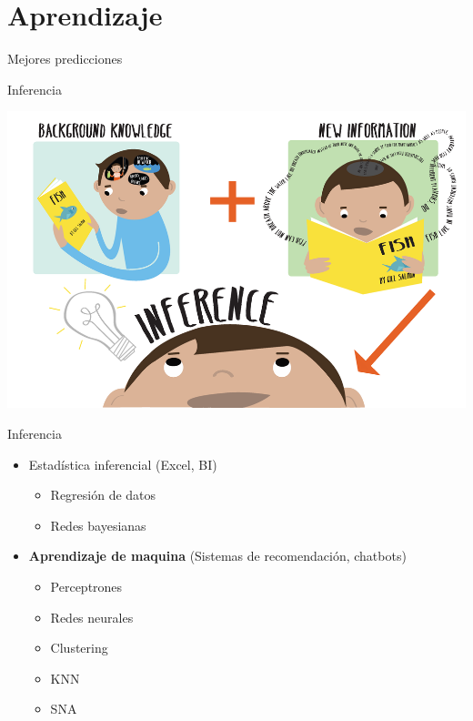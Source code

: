 \documentclass{beamer}
\begin{document}
\section{Aprendizaje}
\begin{frame}
    \begin{center}
        \large Mejores predicciones
    \end{center}
\end{frame}

\begin{frame}{Inferencia}
    \begin{center}
        \includegraphics[width=0.9\linewidth]{Images/inferencia}
    \end{center}
\end{frame}

\begin{frame}{Inferencia}
\begin{itemize}
    \item Estadística inferencial (Excel, BI)
    \begin{itemize}
        \item Regresión de datos
        \item Redes bayesianas
    \end{itemize}
    \item \textbf{Aprendizaje de maquina} (Sistemas de recomendación, chatbots)
    \begin{itemize}
        \item Perceptrones
        \item Redes neurales
        \item Clustering
        \item KNN
        \item SNA
    \end{itemize}
\end{itemize}
\end{frame}
\end{document}
